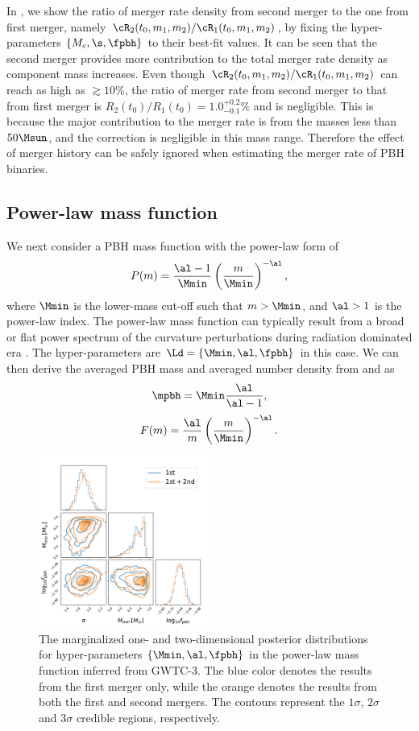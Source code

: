 \documentclass[
reprint,           %
superscriptaddress,%
amsmath,           %
amssymb,           %
aps,               %
prd,               %
notitlepage,       %
longbibliography,  %
floatfix,          %
nofootinbib,
]{revtex4-1}
\def\({\left(}
\def\){\right)}
\def\e{\begin{equation}}
\def\q{\end{equation}}
\begin{document}
In , we show the ratio of merger rate density from second merger to the one from first merger, namely $\cR_2(t_0, m_1, m_2)/\cR_1(t_0, m_1, m_2)$, by fixing the hyper-parameters $\{M_c, \s, \fpbh\}$ to their best-fit values. It can be seen that the second merger provides more contribution to the total merger rate density as component mass increases. Even though $\cR_2(t_0, m_1, m_2)/\cR_1(t_0, m_1, m_2)$ can reach as high as $\gtrsim 10\%$, the ratio of merger rate from second merger to that from first merger is $R_2(t_0)/R_1(t_0) = 1.0^{+0.2}_{-0.1}\%$ and is negligible. This is because the major contribution to the merger rate is from the masses less than $50\Msun$, and the correction is negligible in this mass range. Therefore the effect of merger history can be safely ignored when estimating the merger rate of PBH binaries.

\subsection{Power-law mass function}


We next consider a PBH mass function with the power-law form of \cite{Carr:1975qj}
\e\label{power} 
P(m) = \frac{\al-1}{\Mmin} \(\frac{m}{\Mmin}\)^{-\al},
\q
where $\Mmin$ is the lower-mass cut-off such that $m>\Mmin$, and $\al>1$ is the power-law index. 
The power-law mass function can typically result from a broad or flat power spectrum of the curvature perturbations \cite{DeLuca:2020ioi} during radiation dominated era \cite{Carr:2016drx,Carr:2017jsz}.
The hyper-parameters are $\Ld = \{\Mmin, \al, \fpbh\}$ in this case. 
We can then derive the averaged PBH mass and averaged number density from  and  as
\e
\mpbh = \Mmin \frac{\al}{\al-1},
\q
\e 
F(m) = \frac{\al}{m} \(\frac{m}{\Mmin}\)^{-\al}.
\q

\begin{figure}[tbp!]
	\centering
	\includegraphics[width=0.5\textwidth]{post-power.pdf}
	\caption{\label{posterior-power}The marginalized one- and two-dimensional posterior distributions for hyper-parameters $\{\Mmin, \al, \fpbh\}$ in the power-law mass function inferred from GWTC-3. The blue color denotes the results from the first merger only, while the orange denotes the results from both the first and second mergers. The contours represent the $1\sigma$, $2\sigma$ and $3\sigma$ credible regions, respectively.}
\end{figure}
\end{document}
